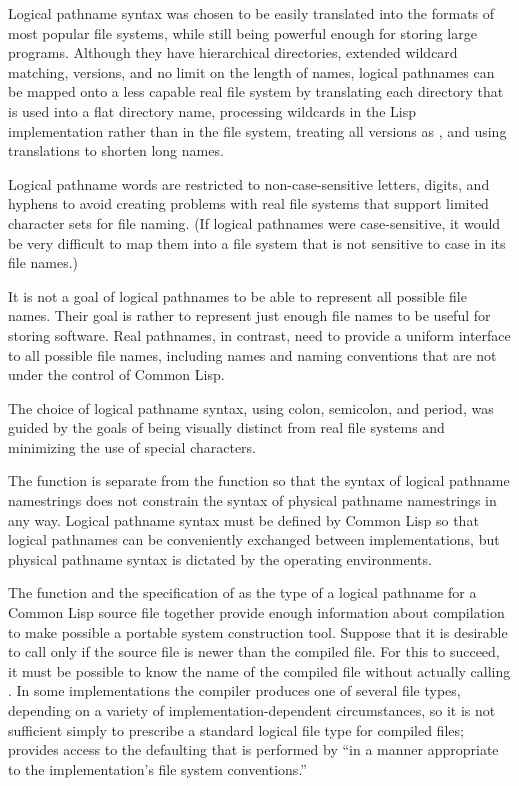 \begin{newer}
   Logical pathname syntax was chosen to be easily translated into the formats of most
  popular file systems, while still being powerful enough for storing large
  programs.  Although they have hierarchical directories, extended wildcard
  matching, versions, and no limit on the length of names, logical pathnames can be
  mapped onto a less capable real file system by translating each
  directory that is used into a flat directory name, processing wildcards in
  the Lisp implementation rather than in the file system, treating all versions as ,
  and using translations to shorten long names.

  Logical pathname words are restricted to non-case-sensitive letters,
  digits, and hyphens to avoid creating problems with real file systems
  that support limited character sets for file naming.
  (If logical pathnames were
  case-sensitive, it would be very difficult to map them into a
  file system that is not sensitive to case in its file names.)

  It is not a goal of logical pathnames to be able to represent all
  possible file names.  Their goal is rather to represent just enough file
  names to be useful for storing software.  Real pathnames, in contrast,
  need to provide a uniform interface to all possible file names, including
  names and naming conventions that are not under the control of Common
  Lisp.

  The choice of logical pathname syntax, using colon, semicolon, and
  period, was guided by the goals of being visually distinct from real file
  systems and minimizing the use of special characters.

  The  function is separate from the  function
  so that the syntax of logical pathname namestrings does not constrain the
  syntax of physical pathname namestrings in any way.  Logical pathname
  syntax must be defined by Common Lisp so that logical pathnames can be
  conveniently exchanged between implementations, but physical pathname
  syntax is dictated by the operating environments.


  The  function and the specification of 
  as the type of a logical pathname for a Common Lisp source file together
  provide enough information about compilation to make possible a portable system
  construction tool.  Suppose that it is desirable
  to call  only if the source file is newer than the compiled
  file.  For this to succeed, it must be possible to know the name of the
  compiled file without actually calling .
  In some implementations the compiler produces one of several file types,
  depending on a variety of implementation-dependent circumstances,
  so it is not sufficient simply to prescribe a standard logical file type
  for compiled files;
   provides access to the defaulting that is performed
  by  ``in a manner
  appropriate to the implementation's file system conventions.''


\end{newer}
